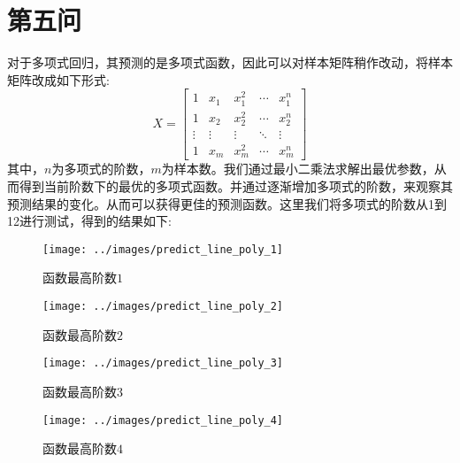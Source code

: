 \documentclass[UTF8]{article} %
\begin{document}
    \section{第五问}
    对于多项式回归，其预测的是多项式函数，因此可以对样本矩阵稍作改动，将样本矩阵改成如下形式:
    \begin{equation}
        X = \begin{bmatrix}
                1      & x_1    & x_1^2  & \cdots & x_1^n  \\
                1      & x_2    & x_2^2  & \cdots & x_2^n  \\
                \vdots & \vdots & \vdots & \ddots & \vdots \\
                1      & x_m    & x_m^2  & \cdots & x_m^n
        \end{bmatrix}
        \label{eq:poly_x}
    \end{equation}
    其中，$n$为多项式的阶数，$m$为样本数。我们通过最小二乘法求解出最优参数，从而得到当前阶数下的最优的多项式函数。并通过逐渐增加多项式的阶数，来观察其预测结果的变化。从而可以获得更佳的预测函数。这里我们将多项式的阶数从1到12进行测试，得到的结果如下:

    \begin{figure}[H]
        \begin{minipage}[b]{0.24\linewidth}
            \centering
            \texttt{[image: ../images/predict\_line\_poly\_1]}
            \caption{函数最高阶数$1$}
            \label{fig:poly_1}
        \end{minipage}
        \begin{minipage}[b]{0.24\linewidth}
            \centering
            \texttt{[image: ../images/predict\_line\_poly\_2]}
            \caption{函数最高阶数$2$}
            \label{fig:poly_2}
        \end{minipage}
        \begin{minipage}[b]{0.24\linewidth}
            \centering
            \texttt{[image: ../images/predict\_line\_poly\_3]}
            \caption{函数最高阶数$3$}
            \label{fig:poly_3}
        \end{minipage}
        \begin{minipage}[b]{0.24\linewidth}
            \centering
            \texttt{[image: ../images/predict\_line\_poly\_4]}
            \caption{函数最高阶数$4$}
            \label{fig:poly_4}
        \end{minipage}
    \end{figure}
\end{document}
